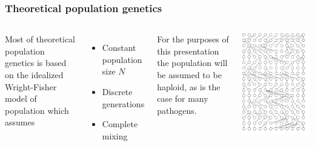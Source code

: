 \begin{frame}
\frametitle{Theoretical population genetics}

\begin{columns}


Most of theoretical population genetics is based on the idealized
Wright-Fisher model of population which assumes

\begin{itemize}
\item Constant population size $N$
\item Discrete generations
\item Complete mixing
\end{itemize}
For the purposes of this presentation the population will be assumed to be haploid,
as is the case for many pathogens. 



\includegraphics[scale=0.25]{../images/wrightFisher}

\end{columns}

\end{frame}


